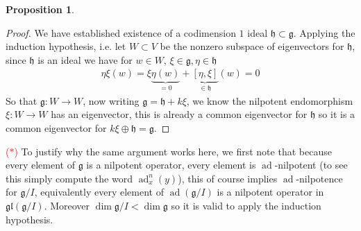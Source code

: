 \documentclass[10.5pt]{article}
\theoremstyle{definition}
\newtheorem{proposition}{Proposition}
\numberwithin{example}{subsection}
\numberwithin{pb}{subsection}
\begin{document}
\begin{proposition}
\begin{proof}
                We have established existence of a codimension \(1\) ideal \(\mathfrak{h} \subset \mathfrak{g}\). Applying the induction hypothesis, i.e. let \(W \subset V\) be the nonzero subspace of eigenvectors for \(\mathfrak{h}\), since \(\mathfrak{h}\) is an ideal we have for \(w \in W\), \(\xi \in \mathfrak{g}, \eta \in \mathfrak{h}\)
                \begin{align}
                    \eta\xi(w) = \xi \underbrace{\eta (w)}_{=0} + \underbrace{[\eta,\xi]}_{\in \mathfrak{h}}(w) = 0
                \end{align}
                So that \(\mathfrak{g}: W \to W\), now writing \(\mathfrak{g} = \mathfrak{h} + k\xi\), we know the nilpotent endomorphism \(\xi: W \to W\) has an eigenvector,  this is already a common eigenvector for \(\mathfrak{h}\) so it is a common eigenvector for \(k\xi \oplus \mathfrak{h} = \mathfrak{g}\).
            \end{proof}
        \end{proposition}

        \textcolor{red}{(\(*\))} To justify why the same argument works here, we first note that because every element of \(\mathfrak{g}\) is a nilpotent operator, every element is \(\operatorname{ad}\)-nilpotent (to see this simply compute the word \(\operatorname{ad}_x^{n}(y)\)), this of course implies \(\operatorname{ad}\)-nilpotence for \(\mathfrak{g}/I\), equivalently every element of \(\operatorname{ad}(\mathfrak{g}/I)\) is a nilpotent operator in \(\mathfrak{gl}(\mathfrak{g}/I)\). Moreover \(\dim \mathfrak{g}/I < \dim \mathfrak{g}\) so it is valid to apply the induction hypothesis.
        \newpage
\end{document}
